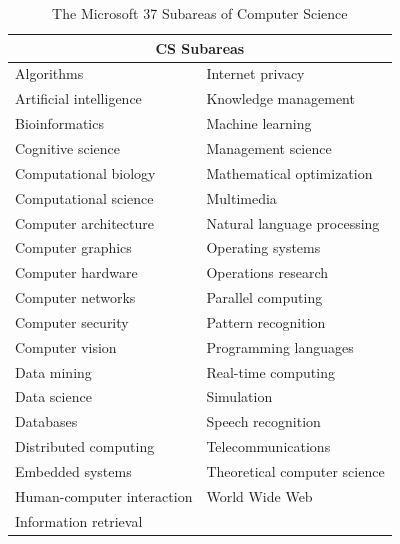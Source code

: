 \documentclass[msc]{ppgccufmg}
\begin{document}
\begin{table}[htbp]
  \centering
  \caption{The Microsoft 37 Subareas of Computer Science}
  \label{tab:subareas-list}
  \begin{tabular}{ll}
    \toprule
    \multicolumn{2}{c}{CS Subareas}\\
    \midrule
    Algorithms & Internet privacy \\
    Artificial intelligence & Knowledge management \\
    Bioinformatics & Machine learning \\ 
    Cognitive science & Management science \\ 
    Computational biology & Mathematical optimization \\ 
    Computational science & Multimedia \\ 
    Computer architecture & Natural language processing \\ 
    Computer graphics & Operating systems \\ 
    Computer hardware & Operations research \\ 
    Computer networks & Parallel computing \\ 
    Computer security & Pattern recognition \\ 
    Computer vision & Programming languages \\ 
    Data mining &  Real-time computing \\ 
    Data science & Simulation \\ 
    Databases & Speech recognition \\ 
    Distributed computing & Telecommunications \\ 
    Embedded systems & Theoretical computer science \\ 
    Human-computer interaction & World Wide Web \\
    Information retrieval \\
  \bottomrule
\end{tabular}
\end{table}
\end{document}
